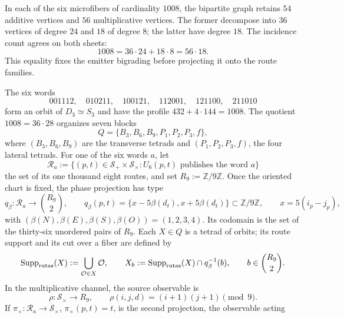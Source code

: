In each of the six microfibers of cardinality \(1008\), the bipartite graph
retains \(54\) additive vertices and \(56\) multiplicative vertices. The
former decompose into \(36\) vertices of degree \(24\) and \(18\) of
degree \(8\); the latter have degree \(18\). The incidence count
agrees on both sheets:
\begin{equation}
 1008=36\cdot24+18\cdot8=56\cdot18.
 \label{eq:bidegraduacion-microfibra-masas-autonoma}
\end{equation}
This equality fixes the emitter bigrading before projecting it onto
the route families.

The six words
\begin{equation}
 001112,\quad010211,\quad100121,\quad112001,\quad121100,\quad211010
 \label{eq:seis-palabras-microfibra-masas-autonoma}
\end{equation}
form an orbit of \(D_3\simeq S_3\) and have the profile
\(432+4\cdot144=1008\). The quotient \(1008=36\cdot28\) organizes seven
blocks
\[
 Q=\{B_3,B_6,B_9,P_1,P_2,P_3,f\},
\]
where \((B_3,B_6,B_9)\) are the transverse tetrads and
\((P_1,P_2,P_3,f)\), the four lateral tetrads. For one of the six
words \(a\), let
\[
 \mathcal R_a
 :=\{(p,t)\in\mathcal S_+\times\mathcal S_\times:
       U_6(p,t)\text{ publishes the word }a\}
\]
the set of its one thousand eight routes, and set
\(R_9:=\mathbb Z/9\mathbb Z\). Once the oriented chart is fixed, the phase
projection has type
\begin{equation}
 q_\beta:\mathcal R_a\longrightarrow\binom{R_9}{2},
 \qquad
 q_\beta(p,t)
 =\{x-5\beta(d_t),x+5\beta(d_t)\}\subset\mathbb Z/9\mathbb Z,
 \qquad x=5(i_p-j_p),
 \label{eq:proyeccion-fano-semillas-masas-autonoma}
\end{equation}
with \((\beta(N),\beta(E),\beta(S),\beta(O))=(1,2,3,4)\). Its codomain is
the set of the thirty-six unordered pairs of \(R_9\). Each
\(X\in Q\) is a tetrad of orbits;
its route support and its cut over a fiber are defined by
\[
 \operatorname{Supp}_{\rm rutas}(X)
 :=\bigcup_{\mathcal O\in X}\mathcal O,
 \qquad
 X_b:=\operatorname{Supp}_{\rm rutas}(X)\cap q_\beta^{-1}(b),
 \qquad b\in\binom{R_9}{2}.
\]
In the multiplicative channel, the source observable is
\begin{equation}
 \rho:\mathcal S_\times\longrightarrow R_9,
 \qquad
 \rho(i,j,d)=(i+1)(j+1)\pmod9.
 \label{eq:residuo-producto-fano-semillas-rev3}
\end{equation}
If \(\pi_\times:\mathcal R_a\to\mathcal S_\times\),
\(\pi_\times(p,t)=t\), is the second projection, the observable acting
